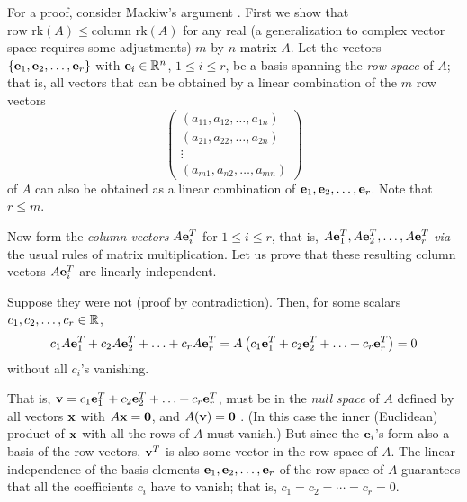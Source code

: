 {\color{OliveGreen}
\bproof

For a proof, consider   Mackiw's   argument  \cite{Mackiw-1995}.
First we show that $\textrm{row rk} (A)\le \textrm{column rk} (A)$ for any real
(a generalization to complex vector space requires some adjustments)
$m$-by-$n$ matrix $A$. Let the vectors
$\{{\bf e}_1,{\bf e}_2, \ldots ,{\bf e}_r\}$ with ${\bf e}_i \in {\Bbb R}^n$, $1\le i\le r$,
be a basis spanning the
{\em row space} of
 $A$; that is, all vectors
that can be obtained by a linear combination of the $m$ row vectors
$$
\begin{pmatrix}
(a_{11},a_{12},\ldots ,a_{1n})\\
(a_{21},a_{22},\ldots ,a_{2n})\\
\vdots                    \\
(a_{m1},a_{n2},\ldots ,a_{mn})
\end{pmatrix}
$$
of $A$ can also be obtained as a linear combination of ${\bf e}_1,{\bf e}_2, \ldots ,{\bf e}_r$.
Note that $r\le m$.

Now form the {\em column vectors} $A{\bf e}_i^T$ for $1\le i\le r$, that is,
$A{\bf e}_1^T,A{\bf e}_2^T, \ldots ,A{\bf e}_r^T$ {\em via} the usual rules of matrix multiplication.
Let us prove that these resulting column vectors $A{\bf e}_i^T$ are linearly independent.

Suppose they were not (proof by contradiction).
Then, for some scalars
$c_1,c_2, \ldots ,c_r \in {\Bbb R}$,
$$
c_1 A{\bf e}_1^T+ c_2 A{\bf e}_2^T+ \ldots + c_r A{\bf e}_r^T
=
 A\left(c_1{\bf e}_1^T+ c_2  {\bf e}_2^T+ \ldots + c_r  {\bf e}_r^T \right)=0
$$
without all $c_i$'s vanishing.

That is,
$
{\bf v} =
c_1{\bf e}_1^T+ c_2  {\bf e}_2^T+ \ldots + c_r  {\bf e}_r^T
$, must be in the {\em null space}
of $A$ defined by all vectors ${\bf x}$ with $A{\bf x}={\bf 0}$,
and $A({\bf v})={\bf 0}$ .
(In this case the inner (Euclidean) product of ${\bf x}$ with all the rows of $A$ must vanish.)
But since the ${\bf e}_i$'s form also a basis of the row vectors,
$
{\bf v}^T
$
is also some vector in the row space of $A$.
The linear independence of the basis elements
${\bf e}_1,{\bf e}_2, \ldots ,{\bf e}_r$   of the row  space of $A$
guarantees that
all the coefficients $c_i$ have to vanish; that is,
$c_1=c_2= \cdots =c_r =0$.

}
